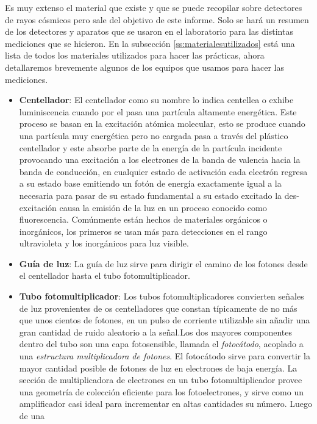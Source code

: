 \documentclass[a4paper,10pt]{article}
\numberwithin{equation}{section}
\begin{document}
Es muy extenso el material que existe y que se puede recopilar sobre detectores de 
rayos cósmicos pero sale del objetivo de este informe. Solo se hará un resumen de los 
detectores y aparatos que se usaron en el laboratorio para las distintas mediciones 
que se hicieron. En la subsección \eqref{ss:materialesutilizados} está una lista de 
todos los materiales utilizados para hacer las prácticas, ahora detallaremos brevemente
algunos de los equipos que usamos para hacer las mediciones.

\begin{itemize}
 \item \textbf{Centellador}: El centellador como su nombre lo indica centellea o exhibe 
 luminiscencia cuando por el pasa una partícula altamente energética. Este proceso
 se basan en la excitación atómica molecular, esto se produce cuando una partícula 
 muy  energética pero no cargada pasa a través del plástico centellador  y 
 este absorbe parte de la energía de la partícula incidente provocando una excitación
 a los electrones de la banda de valencia  hacia la banda de conducción, en cualquier 
 estado de activación cada electrón regresa a su estado base emitiendo un fotón de
 energía exactamente igual a la necesaria para pasar de su estado fundamental a su
 estado excitado la des-excitación causa la emisión de la luz en un proceso
 conocido como fluorescencia. Comúnmente están hechos de materiales orgánicos 
 o inorgánicos, los primeros se usan más para detecciones en el rango ultravioleta 
 y los inorgánicos para luz visible.
 \item \textbf{Guía de luz}: La guía de luz sirve para dirigir el camino de los fotones
 desde el centellador hasta el tubo fotomultiplicador. 
 \item \textbf{Tubo fotomultiplicador}: Los tubos fotomultiplicadores convierten 
 señales de luz provenientes de os centelladores que constan típicamente de no más 
 que unos cientos de fotones, en un pulso  de corriente utilizable sin añadir una 
 gran cantidad de ruido aleatorio a la señal.Los dos mayores componentes dentro del 
 tubo son una capa fotosensible, llamada  el \emph{fotocátodo}, acoplado a una 
 \emph{estructura multiplicadora de fotones}.  El fotocátodo sirve para convertir la
 mayor cantidad posible de fotones de luz  en electrones de baja energía. La sección
 de multiplicadora de electrones en un tubo fotomultiplicador provee una geometría
 de colección eficiente para los fotoelectrones, y sirve como un amplificador
 casi ideal para incrementar en altas cantidades su número. Luego de una 

\end{itemize}
\end{document}
